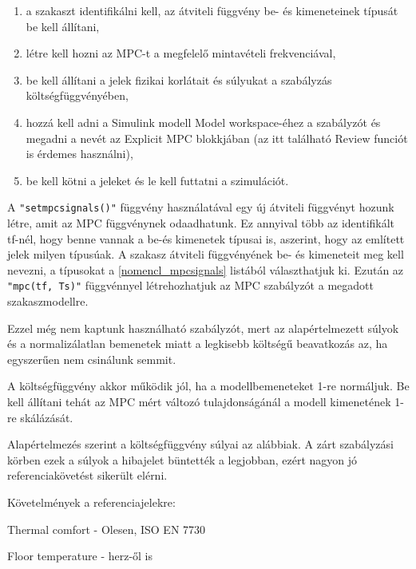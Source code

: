 \begin{enumerate}[noitemsep,topsep=0pt,parsep=2pt,partopsep=4pt,leftmargin=30pt]
	\item a szakaszt identifikálni kell, az átviteli függvény be- és kimeneteinek típusát be kell állítani,
	\item létre kell hozni az MPC-t a megfelelő mintavételi frekvenciával,
	\item be kell állítani a jelek fizikai korlátait és súlyukat a szabályzás költségfüggvényében,
	\item hozzá kell adni a Simulink modell Model workspace-éhez a szabályzót és megadni a nevét az Explicit MPC blokkjában (az itt található Review funciót is érdemes használni),
	\item be kell kötni a jeleket és le kell futtatni a szimulációt.
	
\end{enumerate}


A \verb|"setmpcsignals()"| függvény használatával egy új átviteli függvényt hozunk létre, amit az MPC függvénynek odaadhatunk. Ez annyival több az identifikált tf-nél, hogy benne vannak a be-és kimenetek típusai is, aszerint, hogy az említett jelek milyen típusúak. A szakasz átviteli függvényének be- és kimeneteit meg kell nevezni, a típusokat a \ref{nomencl_mpcsignals} listából választhatjuk ki. Ezután az \verb|"mpc(tf, Ts)"| függvénnyel létrehozhatjuk az MPC szabályzót a megadott szakaszmodellre.

Ezzel még nem kaptunk használható szabályzót, mert az alapértelmezett súlyok és a normalizálatlan bemenetek miatt a legkisebb költségű beavatkozás az, ha egyszerűen nem csinálunk semmit.

A költségfüggvény akkor működik jól, ha a modellbemeneteket 1-re normáljuk. Be kell állítani tehát az MPC mért változó tulajdonságánál a modell kimenetének 1-re skálázását. 

Alapértelmezés szerint a költségfüggvény súlyai az alábbiak. A zárt szabályzási körben ezek a súlyok a hibajelet büntették a legjobban, ezért nagyon jó referenciakövetést sikerült elérni.


Követelmények a referenciajelekre:

Thermal comfort - Olesen, ISO EN 7730

Floor temperature - herz-ől is



